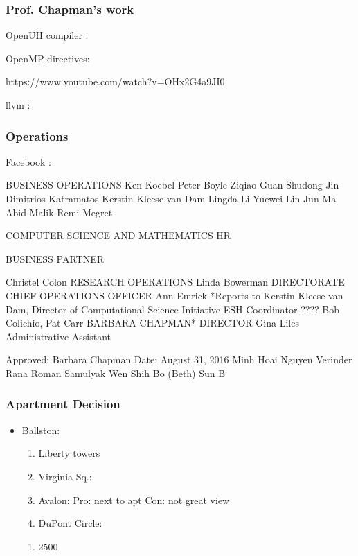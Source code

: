 \begin{frame} 
\frametitle{ Prof. Chapman's work}  

OpenUH compiler : 

OpenMP directives: 


https://www.youtube.com/watch?v=OHx2G4a9JI0 

llvm : 
\end{frame}  


\begin{frame}
\frametitle{Operations} 

Facebook : 


BUSINESS OPERATIONS
Ken Koebel
Peter Boyle
Ziqiao
Guan
Shudong
Jin
Dimitrios Katramatos 
Kerstin Kleese van Dam
Lingda Li
Yuewei Lin
Jun Ma
Abid Malik
Remi Megret

COMPUTER SCIENCE AND MATHEMATICS 
HR 

BUSINESS PARTNER

Christel 
Colon
RESEARCH OPERATIONS
Linda Bowerman 
DIRECTORATE CHIEF
OPERATIONS 
OFFICER
Ann Emrick 
*Reports to Kerstin Kleese van Dam, Director of Computational
Science Initiative
ESH Coordinator 
????
Bob Colichio, Pat Carr
BARBARA CHAPMAN*
DIRECTOR
Gina Liles
Administrative Assistant

Approved: Barbara Chapman          Date: August 31, 2016
Minh Hoai Nguyen
Verinder Rana
Roman Samulyak
Wen Shih
Bo (Beth) Sun
B
\end{frame} 



\begin{frame}
\frametitle{ Apartment Decision}
\begin{itemize}
\item \small Ballston:
\begin{enumerate} 
\tiny \item \tiny Liberty towers
\item \tiny Virginia Sq.: 
\item \tiny Avalon: 
Pro: 
next to apt
Con: 
not great view 
\item \small  DuPont Circle: 
\end{enumerate} 


\begin{enumerate} 
\item \tiny  2500 
\end{enumerate} 
\end{itemize} 

\end{frame} 

